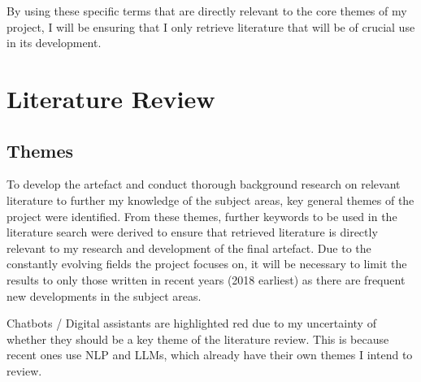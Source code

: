 \documentclass[12pt]{report}
\begin{document}
    \noindent
    By using these specific terms that are directly relevant to the core themes of my project,
    I will be ensuring that I only retrieve literature that will be of crucial use in its 
    development.


    \chapter{Literature Review}

    \section{Themes}

    To develop the artefact and conduct thorough background research on relevant literature to further my 
    knowledge of the subject areas, key general themes of the project were identified. From these themes, further 
    keywords to be used in the literature search were derived to ensure that retrieved literature is directly relevant 
    to my research and development of the final artefact. Due to the constantly evolving fields the project focuses 
    on, it will be necessary to limit the results to only those written in recent years (2018 earliest) as there are 
    frequent new developments in the subject areas.

\pagebreak
    \begin{tcolorbox}[colback=red!5!white,colframe=orange!75!black,title=Uncertainty]
        Chatbots / Digital assistants are highlighted red due to my uncertainty of whether they should 
        be a key theme of the literature review. This is because recent ones use NLP and LLMs, which already have
        their own themes I intend to review.
    \end{tcolorbox}
\end{document}
